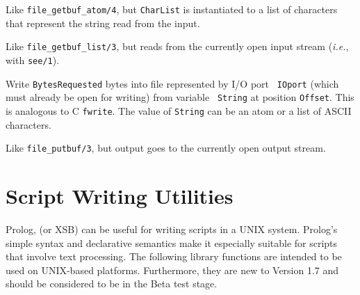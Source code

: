\begin{description}
Like \verb|file_getbuf_atom/4|, but {\tt CharList} is instantiated to a list
of characters that represent the string read from the input.

Like \verb|file_getbuf_list/3|, but reads from the currently open input stream
({\it i.e.}, with {\tt see/1}).


Write {\tt BytesRequested} bytes into file represented by I/O port {\tt
  IOport} (which must already be open for writing) from variable {\tt
  String} at position {\tt Offset}. This is analogous to C {\tt fwrite}.
The value of {\tt String} can be an atom or a list of ASCII characters.

Like \verb|file_putbuf/3|, but output goes to the currently open output stream.


\end{description}

\section{Script Writing Utilities}

Prolog, (or XSB) can be useful for writing scripts in a UNIX system.
Prolog's simple syntax and declarative semantics make it especially
suitable for scripts that involve text processing.  The following
library functions are intended to be used on UNIX-based platforms.
Furthermore, they are new to Version 1.7 and should be considered to
be in the Beta test stage.


